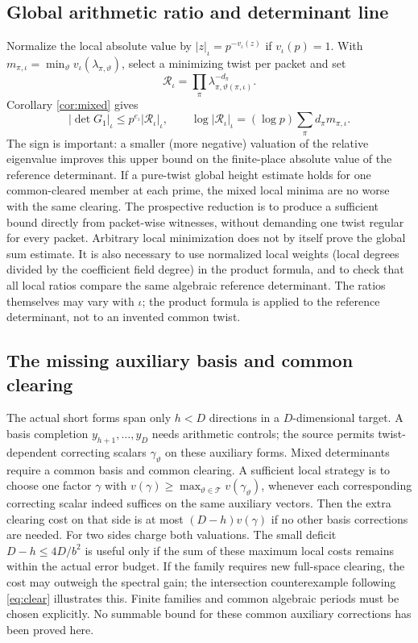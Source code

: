 \documentclass[11pt,a4paper]{article}
\begin{document}
\subsection{Global arithmetic ratio and determinant line}
Normalize the local absolute value by $|z|_\iota=p^{-v_\iota(z)}$ if $v_\iota(p)=1$. With $m_{\pi,\iota}=\min_\vartheta v_\iota(\lambda_{\pi,\vartheta})$, select a minimizing twist per packet and set
\begin{equation}\label{eq:ratio}
\mathcal R_\iota=\prod_\pi \lambda_{\pi,\vartheta(\pi,\iota)}^{-d_\pi}.
\end{equation}
Corollary \ref{cor:mixed} gives
\begin{equation}\label{eq:absratio}
|\det G_1|_\iota\leq p^{e_\iota}|\mathcal R_\iota|_\iota,
\qquad\log|\mathcal R_\iota|_\iota=(\log p)\sum_\pi d_\pi m_{\pi,\iota}.
\end{equation}
The sign is important: a smaller (more negative) valuation of the relative eigenvalue improves this upper bound on the finite-place absolute value of the reference determinant. If a pure-twist global height estimate holds for one common-cleared member at each prime, the mixed local minima are no worse with the same clearing. The prospective reduction is to produce a sufficient bound directly from packet-wise witnesses, without demanding one twist regular for every packet. Arbitrary local minimization does not by itself prove the global sum estimate. It is also necessary to use normalized local weights (local degrees divided by the coefficient field degree) in the product formula, and to check that all local ratios compare the same algebraic reference determinant. The ratios themselves may vary with $\iota$; the product formula is applied to the reference determinant, not to an invented common twist.

\subsection{The missing auxiliary basis and common clearing}
The actual short forms span only $h<D$ directions in a $D$-dimensional target. A basis completion $y_{h+1},\ldots,y_D$ needs arithmetic controls; the source permits twist-dependent correcting scalars $\gamma_\vartheta$ on these auxiliary forms. Mixed determinants require a common basis and common clearing. A sufficient local strategy is to choose one factor $\gamma$ with $v(\gamma)\geq\max_{\vartheta\in\mathcal T}v(\gamma_\vartheta)$, whenever each corresponding correcting scalar indeed suffices on the same auxiliary vectors. Then the extra clearing cost on that side is at most $(D-h)v(\gamma)$ if no other basis corrections are needed. For two sides charge both valuations. The small deficit $D-h\leq4D/b^2$ is useful only if the sum of these maximum local costs remains within the actual error budget. If the family requires new full-space clearing, the cost may outweigh the spectral gain; the intersection counterexample following \eqref{eq:clear} illustrates this. Finite families and common algebraic periods must be chosen explicitly. No summable bound for these common auxiliary corrections has been proved here.
\end{document}

